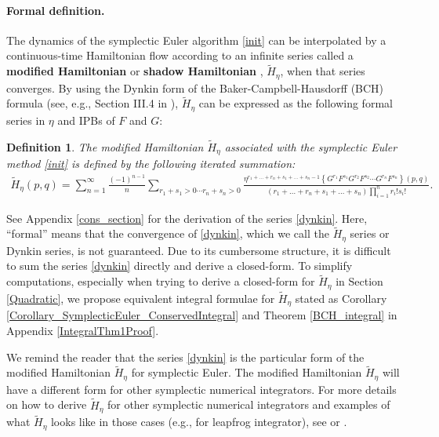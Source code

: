 \documentclass[11pt]{article}
\newtheorem{definition}{Definition}
\begin{document}
\paragraph{Formal definition.} The dynamics of the symplectic Euler algorithm \eqref{init} can be interpolated by a continuous-time Hamiltonian flow according to an infinite series called a \textbf{modified Hamiltonian} \citep{Field2003, Alsallami2018} or \textbf{shadow Hamiltonian} \citep{Engle2005}, $\widetilde{H}_{\eta}$, when that series converges. By using the Dynkin form of the Baker-Campbell-Hausdorff (BCH) formula (see, e.g., Section III.4 in \cite{Hairer2006}), $\widetilde{H}_{\eta}$ can be expressed as the following formal series in $\eta$ and IPBs of $F$ and $G$: 

\begin{definition}
    The \textit{modified Hamiltonian} $\widetilde{H}_{\eta}$ associated with the symplectic Euler method \eqref{init} is defined by the following iterated summation:
    \begin{gather}
        \widetilde{H}_{\eta}\left(p,q\right)=\sum_{n=1}^{\infty}{\frac{\left(-1\right)^{n-1}}{n}{\sum_{r_{1}+s_{1}>0 \cdots r_{n}+s_{n}>0}{\frac{\eta^{r_{1}+\dots+r_{n}+s_{1}+\dots+s_{n}-1}\left\{G^{r_{1}}F^{s_{1}}G^{r_{2}}F^{s_{2}}\cdots G^{r_{n}}F^{s_{n}}\right\}(p,q)}{\left(r_{1}+\dots+r_{n}+s_{1}+\dots+s_{n}\right)\prod_{i=1}^{n}{r_{i}!s_{i}!}}}}}.\label{dynkin}
    \end{gather}
\end{definition}

See Appendix \ref{cons_section} for the derivation of the series \eqref{dynkin}. Here, ``formal'' means that the convergence of \eqref{dynkin}, which we call the $\widetilde{H}_{\eta}$ series or Dynkin series, is not guaranteed. Due to its cumbersome structure, it is difficult to sum the series \eqref{dynkin} directly and derive a closed-form. To simplify computations, especially when trying to derive a closed-form for $\widetilde{H}_{\eta}$ in Section \ref{Quadratic}, we propose equivalent integral formulae for $\widetilde{H}_{\eta}$ stated as Corollary \ref{Corollary_SymplecticEuler_ConservedIntegral} and Theorem \ref{BCH_integral} in Appendix \ref{IntegralThm1Proof}.

We remind the reader that the series \eqref{dynkin} is the particular form of the modified Hamiltonian $\widetilde{H}_{\eta}$ for symplectic Euler. The modified Hamiltonian $\widetilde{H}_{\eta}$ will have a different form for other symplectic numerical integrators. For more details on how to derive $\widetilde{H}_{\eta}$ for other symplectic numerical integrators and examples of what $\widetilde{H}_{\eta}$ looks like in those cases (e.g., for leapfrog integrator), see \citep{Yoshida1993, Skeel} or \cite[Chapters IX and XV]{Hairer2006}.
\end{document}
